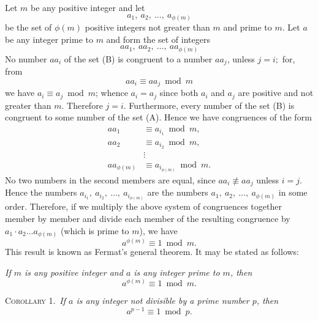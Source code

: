\documentclass[oneside]{book}
\begin{document}
Let $m$ be any positive integer and let
\begin{equation}
a_1,\ a_2,\ \ldots,\ a_{\phi(m)} \tag{A}
\end{equation}
be the set of $\phi(m)$ positive integers not greater than $m$ and
prime to $m$. Let $a$ be any integer prime to $m$ and form the set
of integers
\begin{equation}
aa_1,\ aa_2,\ \ldots,\ aa_{\phi(m)} \tag{B}
\end{equation}
No number $aa_i$ of the set (B) is congruent to a number $aa_j$,
unless $j = i;$ for, from
\begin{equation*}
aa_i \equiv aa_j \bmod m
\end{equation*}
we have $a_i \equiv a_j \bmod m$; whence $a_i = a_j$ since both
$a_i$ and $a_j$ are positive and not greater than $m$. Therefore $j
= i$. Furthermore, every number of the set (B) is congruent to some
number of the set (A). Hence we have congruences of the form
\begin{align*}
aa_1         & \equiv a_{i_1} \bmod m, \\
aa_2         & \equiv a_{i_2} \bmod m, \\
             & \vdots \\
aa_{\phi(m)} & \equiv a_{i_{\phi(m)}} \bmod m.
\end{align*}
No two numbers in the second members are equal, since $aa_i
\not\equiv aa_j$ unless $i= j$. Hence the numbers $a_{i_1},\
a_{i_2},\ \ldots,\ a_{i_{\phi(m)}}$ are the numbers $a_1,\ a_2,\
\ldots,\ a_{\phi(m)}$ in some order. Therefore, if we multiply the
above system of congruences together member by member and divide
each member of the resulting congruence by $a_1\cdot a_2\ldots
a_{\phi(m)}$ (which is prime to $m$), we have
\begin{equation*}
a^{\phi(m)} \equiv 1 \bmod m.
\end{equation*}
This result is known as Fermat's general theorem.%
 It may be stated as follows:

\emph{If $m$ is any positive integer and $a$ is any integer prime to
$m$, then}
\begin{equation*}
a^{\phi(m)} \equiv 1 \bmod m.
\end{equation*}

\smallskip \textsc{Corollary 1.}~\emph{If $a$ is any integer
not divisible by a prime number $p$, then}
\begin{equation*}
a^{p-1} \equiv 1 \bmod p.
\end{equation*}
\end{document}
